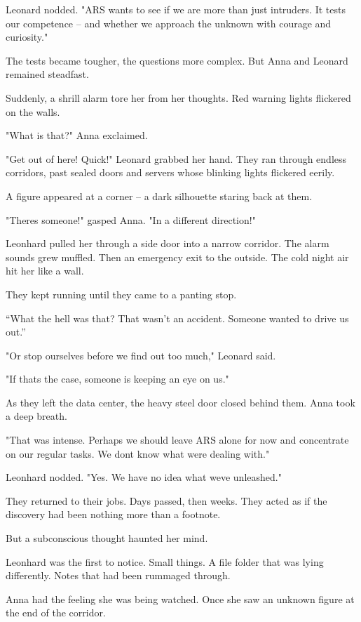 \documentclass[
]{article}
\begin{document}
Leonard nodded. "ARS wants to see if we are more than just intruders. It tests our competence -- and whether we approach the unknown with courage and curiosity."

The tests became tougher, the questions more complex. But Anna and Leonard remained steadfast.

Suddenly, a shrill alarm tore her from her thoughts. Red warning lights flickered on the walls.

"What is that?" Anna exclaimed.

"Get out of here! Quick!" Leonard grabbed her hand. They ran through endless corridors, past sealed doors and servers whose blinking lights flickered eerily.

A figure appeared at a corner -- a dark silhouette staring back at them.

"There\textquotesingle s someone!" gasped Anna. "In a different direction!"

Leonhard pulled her through a side door into a narrow corridor. The alarm sounds grew muffled. Then an emergency exit to the outside. The cold night air hit her like a wall.

They kept running until they came to a panting stop.

``What the hell was that? That wasn't an accident. Someone wanted to drive us out.''

"Or stop ourselves before we find out too much," Leonard said.

"If that\textquotesingle s the case, someone is keeping an eye on us."

As they left the data center, the heavy steel door closed behind them. Anna took a deep breath.

"That was intense. Perhaps we should leave ARS alone for now and concentrate on our regular tasks. We don\textquotesingle t know what we\textquotesingle re dealing with."

Leonhard nodded. "Yes. We have no idea what we\textquotesingle ve unleashed."

They returned to their jobs. Days passed, then weeks. They acted as if the discovery had been nothing more than a footnote.

But a subconscious thought haunted her mind.

Leonhard was the first to notice. Small things. A file folder that was lying differently. Notes that had been rummaged through.

Anna had the feeling she was being watched. Once she saw an unknown figure at the end of the corridor.
\end{document}
